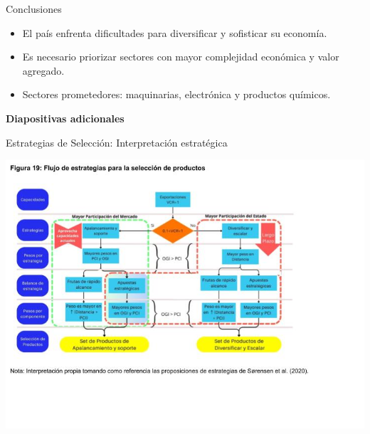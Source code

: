 \documentclass{beamer}
\begin{document}
\begin{frame}{Conclusiones}
    \begin{itemize}
        \item El país enfrenta dificultades para diversificar y sofisticar su economía.
        \item Es necesario priorizar sectores con mayor complejidad económica y valor agregado.
        \item Sectores prometedores: maquinarias, electrónica y productos químicos.
    \end{itemize}
\end{frame}
\begin{frame}
    \vfill
    \begin{center}
        \textbf{Diapositivas adicionales}
    \end{center}
    \vfill
\end{frame}

\begin{frame}{Estrategias de Selección: Interpretación estratégica}
    \begin{center}
        \includegraphics[width=1.1\textwidth]{Figura19.jpg}
    \end{center}
    \vspace{-0.25cm}

\end{frame}
\end{document}
